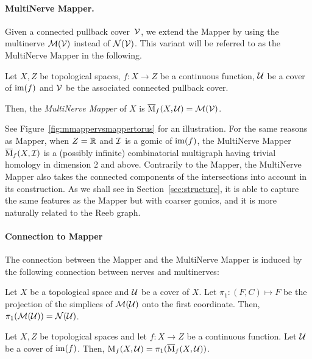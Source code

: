 \paragraph*{MultiNerve Mapper.} Given a connected pullback cover~$\mathcal{V}$, we extend the Mapper by using the
multinerve ${\mathcal M}(\mathcal{V})$ instead of ${\mathcal N}(\mathcal{V})$.  This variant will
be referred to as the MultiNerve Mapper in the following.

\begin{defin}
Let $X,Z$ be topological spaces, $f:X\rightarrow Z$ be a continuous function,
$\mathcal{U}$ be a cover of $\mathrm{im}(f)$ and $\mathcal{V}$ be the associated connected pullback cover.

Then, the \emph{MultiNerve Mapper} of $X$ is $\overline{\mathrm{M}}_f(X,\mathcal{U})=\mathcal{M}(\mathcal{V})$.  
\end{defin}

See Figure~\ref{fig:mmappervsmappertorus} for an illustration.  For
the same reasons as Mapper, when $Z=\mathbb{R}$ and $\mathcal{I}$ is a gomic of
$\mathrm{im}(f)$, the MultiNerve Mapper $\overline{\mathrm{M}}_f(X,\mathcal{I})$ is a (possibly infinite) combinatorial multigraph
having trivial homology in dimension 2 and above. 
Contrarily to the Mapper, the MultiNerve Mapper also takes the connected components of the
intersections into account in its construction. As we shall see in
Section~\ref{sec:structure}, it is able to capture the same features
as the Mapper but with coarser gomics, and it is more naturally
related to the Reeb graph.


\paragraph*{Connection to Mapper}
The connection between the Mapper and the MultiNerve Mapper is
induced by the following connection between nerves and multinerves:

\begin{lem}\label{lem:nerve-vs-multinerve}
Let $X$ be a topological space and $\mathcal{U}$ be a cover of $X$.
Let $\pi_1:(F,C)\mapsto F$ be the projection of the simplices of
$\mathcal{M}(\mathcal{U})$ onto the first coordinate. Then, $\pi_1(\mathcal{M}(\mathcal{U}))=\mathcal{N}(\mathcal{U})$. 
\end{lem}

\begin{cor}
\label{cor:projMNonM}
Let $X,Z$ be topological spaces and let $f:X\rightarrow Z$ be a continuous function.
Let $\mathcal{U}$ be a cover of $\mathrm{im}(f)$. 
Then, $\mathrm{M}_f(X,\mathcal{U})=\pi_1(\overline{\mathrm{M}}_f(X,\mathcal{U}))$.
\end{cor} 

